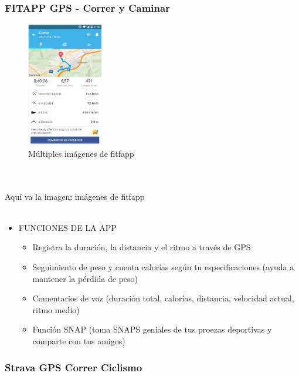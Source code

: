 \documentclass[a4paper, 11pt]{article}
\begin{document}
          \subsubsection{FITAPP GPS - Correr y Caminar}
              \begin{figure}[H]
                  \centering
                    \includegraphics[width=0.3\textwidth]{fitfapp}
                    \caption{Múltiples imágenes de fitfapp}
                    \label{f:fitfapp}
                \end{figure}
                \\\\\textcolor[rgb]{1,0,0}{Aquí va la imagen: imágenes de fitfapp}\\\\
                  \begin{itemize}
                    \item{FUNCIONES DE LA APP}
                    \begin{itemize}
                      \item {Registra la duración, la distancia y el ritmo a través de GPS}
                      \item {Seguimiento de peso y cuenta calorías según tu especificaciones (ayuda a mantener la pérdida de peso)}
                      \item {Comentarios de voz (duración total, calorías, distancia, velocidad actual, ritmo medio)}
                      \item {Función SNAP (toma SNAPS geniales de tus proezas deportivas y comparte con tus amigos)}
                    \end{itemize}
                  \end{itemize}

          \subsubsection{Strava GPS Correr Ciclismo}
\end{document}
